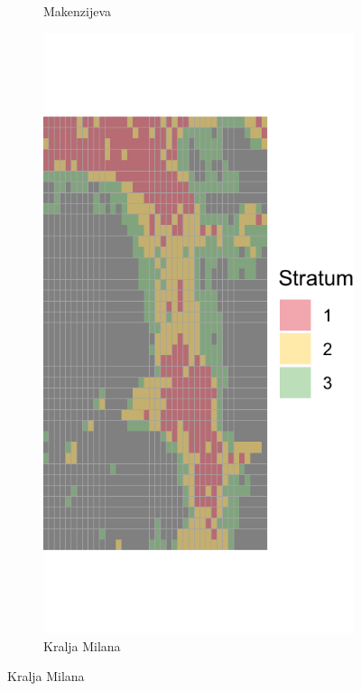 \documentclass[a4paper,12pt]{article}
\begin{document}
\begin{figure}[H]
\begin{subfigure}[b]{0.3\textwidth}
	  \caption{Makenzijeva}
	  \label{fig:makenzijeva}
	\end{subfigure}
	\hfill
	\begin{subfigure}[b]{0.3\textwidth}
	  \centering
	  \includegraphics[width=\textwidth]{../grid_output/strata_viz/kralja-milana_strata.png}
	  \caption{Kralja Milana}
	  \label{fig:kralja-milana}

\end{subfigure}
\end{figure}
\end{document}
